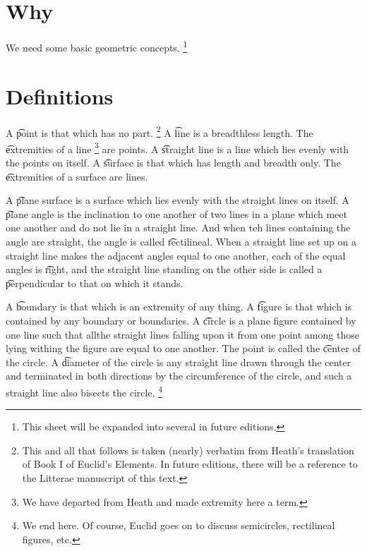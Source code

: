 
\section*{Why}

We need some basic geometric concepts.
  \ifhmode\unskip\fi\footnote{
This sheet will be expanded into several in future editions.
  }
\section*{Definitions}

A \t{point} is that which has no part.
  \ifhmode\unskip\fi\footnote{
This and all that follows is taken (nearly) verbatim from Heath's translation of Book I of Euclid's Elements. In future editions, there will be a reference to the Litterae manuscript of this text.
  }
A \t{line} is a breadthless length.
The \t{extremities of a line}
  \ifhmode\unskip\fi\footnote{
We have departed from Heath and made extremity here a term.
  }
are points.
A \t{straight line} is a line which lies evenly with the points on itself.
A \t{surface} is that which has length and breadth only.
The \t{extremities of a surface} are lines.

A \t{plane surface} is a surface which lies evenly with the straight lines on itself.
A \t{plane angle} is the inclination to one another of two lines in a plane which meet one another and do not lie in a straight line.
And when teh lines containing the angle are straight, the angle is called \t{rectilineal}.
When a straight line set up on a straight line makes the adjacent angles equal to one another, each of the equal angles is \t{right}, and the straight line standing on the other side is called a \t{perpendicular} to that on which it stands.


A \t{boundary} is that which is an extremity of any thing.
A \t{figure} is that which is contained by any boundary or boundaries.
A \t{circle} is a plane figure contained by one line such that allthe straight lines falling upon it from one point among those lying withing the figure are equal to one another.
The point is called the \t{center} of the circle.
A \t{diameter} of the circle is any straight line drawn through the center and terminated in both directions by the circumference of the circle, and such a straight line also bisects the circle.
  \ifhmode\unskip\fi\footnote{
We end here. Of course, Euclid goes on to discuss semicircles, rectilineal figures, etc.
  }

\blankpage